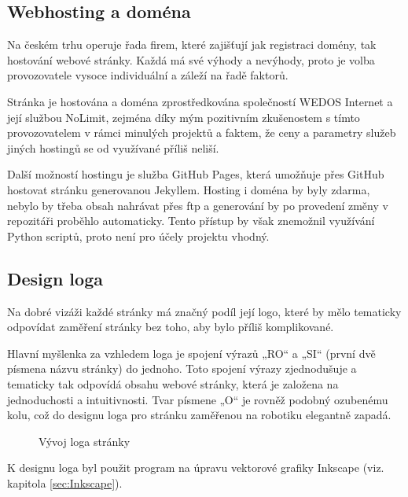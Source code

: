 \documentclass[a4paper, 12pt]{article}
\newcommand*{\fullref}[1]{\hyperref[{#1}]{\ref*{#1}}}
\begin{document}
  \subsection{Webhosting a doména} \label{sec:Webhosting a doména}
  Na českém trhu operuje řada firem, které zajišťují jak registraci domény, tak hostování webové stránky. Každá má své výhody a nevýhody, proto je volba provozovatele vysoce individuální a záleží na řadě faktorů.

  Stránka je hostována a doména zprostředkována společností WEDOS Internet a její službou NoLimit, zejména díky mým pozitivním zkušenostem s tímto provozovatelem v rámci minulých projektů a faktem, že ceny a parametry služeb jiných hostingů se od využívané příliš neliší.

  Další možností hostingu je služba GitHub Pages, která umožňuje přes GitHub hostovat stránku generovanou Jekyllem. Hosting i doména by byly zdarma, nebylo by třeba obsah nahrávat přes \acrshort{ftp} a generování by po provedení změny v repozitáři proběhlo automaticky. Tento přístup by však znemožnil využívání Python scriptů, proto není pro účely projektu vhodný.


  \subsection{Design loga}
  Na dobré vizáži každé stránky má značný podíl její logo, které by mělo tematicky odpovídat zaměření stránky bez toho, aby bylo příliš komplikované.

  Hlavní myšlenka za vzhledem loga je spojení výrazů „RO“ a „SI“ (první dvě písmena názvu stránky) do jednoho. Toto spojení výrazy zjednodušuje a tematicky tak odpovídá obsahu webové stránky, která je založena na jednoduchosti a intuitivnosti. Tvar písmene „O“ je rovněž podobný ozubenému kolu, což do designu loga pro stránku zaměřenou na robotiku elegantně zapadá.

  \begin{figure}[H]%
    \centering

    \hfill
    \hfill

    \caption{Vývoj loga stránky}%
    \label{img:Vývoj loga stránky}%
  \end{figure}

  K designu loga byl použit program na úpravu vektorové grafiky Inkscape (viz. kapitola \fullref{sec:Inkscape}).
\end{document}
